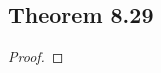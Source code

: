 \documentclass[../../main.tex]{subfiles}
\begin{document}
\subsection{Theorem 8.29}
\begin{wts}

\end{wts}
\begin{proof}

\end{proof}
\end{document}
